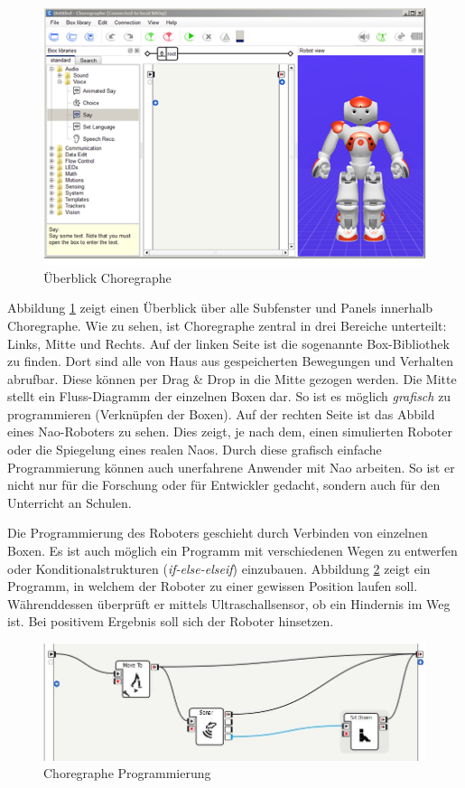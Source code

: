 \begin{figure}[H]						
	\centering							
	\includegraphics[scale=1.0]{Bilder/choregraphe.png}			
	\caption{Überblick Choregraphe}						
	\label{f:nao_choregraphe}						
\end{figure}
\noindent
Abbildung \ref{f:nao_choregraphe} zeigt einen Überblick über alle Subfenster und Panels innerhalb Choregraphe. Wie zu sehen, ist Choregraphe zentral in drei Bereiche unterteilt: Links, Mitte und Rechts.
Auf der linken Seite ist die sogenannte Box-Bibliothek zu finden. Dort sind alle von Haus aus gespeicherten Bewegungen und Verhalten abrufbar. Diese können per Drag \& Drop in die Mitte gezogen werden. Die Mitte stellt ein Fluss-Diagramm der einzelnen Boxen dar. So ist es möglich \textit{grafisch} zu programmieren (Verknüpfen der Boxen). Auf der rechten Seite ist das Abbild eines Nao-Roboters zu sehen. Dies zeigt, je nach dem, einen simulierten Roboter oder die Spiegelung eines realen Naos. 
Durch diese grafisch einfache Programmierung können auch unerfahrene Anwender mit Nao arbeiten. So ist er nicht nur für die Forschung oder für Entwickler gedacht, sondern auch für den Unterricht an Schulen.

Die Programmierung des Roboters geschieht durch Verbinden von einzelnen Boxen. Es ist auch möglich ein Programm mit verschiedenen Wegen zu entwerfen oder Konditionalstrukturen (\textit{if-else-elseif}) einzubauen. Abbildung \ref{f:nao_choregrapheProg} zeigt ein Programm, in welchem der Roboter zu einer gewissen Position laufen soll. Währenddessen überprüft er mittels Ultraschallsensor, ob ein Hindernis im Weg ist. Bei positivem Ergebnis soll sich der Roboter hinsetzen.

\begin{figure}[H]						
	\centering							
	\includegraphics[scale=.6]{Bilder/choregraphe_prog.jpg}			
	\caption{Choregraphe Programmierung}						
	\label{f:nao_choregrapheProg}						
\end{figure}


